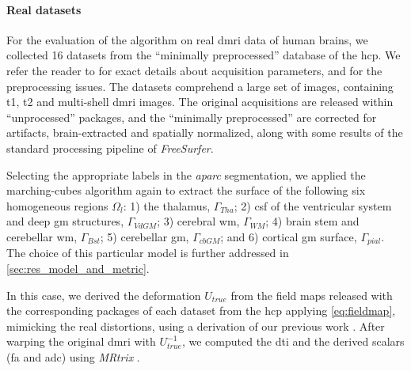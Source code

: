 \paragraph*{Real datasets} %
\label{sec:human_connectome}
%
For the evaluation of the algorithm on real \gls*{dmri} data of human brains,
  we collected 16 datasets from the ``minimally preprocessed''
	 database of the \gls*{hcp}.
We refer the reader to \citep{essen_human_2012} for exact details about acquisition
  parameters, and \citep{glasser_minimal_2013} for the preprocessing issues.
The datasets comprehend a large set of images, containing \gls*{t1}, \gls*{t2} and
  multi-shell \gls*{dmri} images.
The original acquisitions are released within ``unprocessed'' packages, and
  the ``minimally preprocessed'' are corrected for artifacts, brain-extracted
  and spatially normalized, along with some results of the standard processing
  pipeline of \emph{FreeSurfer}.

Selecting the appropriate labels in the \emph{aparc} segmentation, we applied
  the marching-cubes algorithm again to extract the surface of the following
  six homogeneous regions $\Omega_l$:
  1) the thalamus, $\Gamma_{Tha}$;
  2) \gls*{csf} of the ventricular system and deep \gls*{gm} structures, $\Gamma_{VdGM}$;
  3) cerebral \gls*{wm}, $\Gamma_{WM}$;
  4) brain stem and cerebellar \gls*{wm}, $\Gamma_{Bst}$;
	5) cerebellar \gls*{gm}, $\Gamma_{cbGM}$; and
	6) cortical \gls*{gm} surface, $\Gamma_{pial}$.
The choice of this particular model is further addressed in \autoref{sec:res_model_and_metric}.

In this case, we derived the deformation $U_{true}$ from the field maps released with
  the corresponding packages of each dataset from the \gls*{hcp} applying \eqref{eq:fieldmap},
  mimicking the real distortions, using a derivation of our previous work
  \citep{esteban_simulationbased_2014}.
After warping the original \gls*{dmri} with $U_{true}^{-1}$, we computed the \gls*{dti} and
  the derived scalars (\gls*{fa} and \gls*{adc}) using \emph{MRtrix} \citep{tournier_mrtrix_2012}.